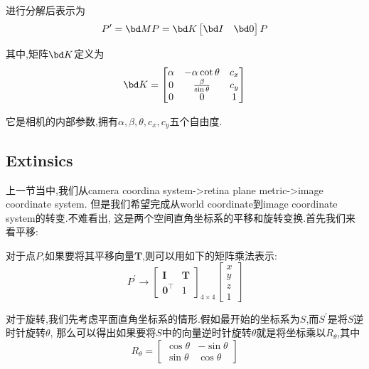 进行分解后表示为
\begin{equation}
	P^\prime = \bd M P = \bd K \begin{bmatrix}
		\bd I & \bd 0
	\end{bmatrix} P
\end{equation}

其中,矩阵$\bd K$定义为
\begin{equation}
	\bd K = \begin{bmatrix}
		\alpha & -\alpha \cot \theta & c_x
		\\
		0 & \frac{\beta}{\sin \theta} & c_y
		\\
		0 & 0 & 1
	\end{bmatrix}
\end{equation}

它是相机的内部参数,拥有$\alpha, \beta, \theta, c_x, c_y$五个自由度.

\subsection{Extinsics}
上一节当中,我们从camera coordina system->retina plane metric->image coordinate system.
但是我们希望完成从world coordinate到image coordinate system的转变.不难看出,
这是两个空间直角坐标系的平移和旋转变换.首先我们来看平移:

对于点$P$,如果要将其平移向量$\bm T$,则可以用如下的矩阵乘法表示:
\begin{equation}
	P^{\prime} \rightarrow\left[\begin{array}{ll}
		\mathbf{I} & \bm T \\
		\bm 0^\top & 1
	\end{array}\right]_{4 \times 4}\left[\begin{array}{c}
		x \\
		y \\
		z \\
		1
	\end{array}\right]
\end{equation}

对于旋转,我们先考虑平面直角坐标系的情形.假如最开始的坐标系为$S$,而$S^\prime$是将$S$逆时针旋转$\theta$,
那么可以得出如果要将$S$中的向量逆时针旋转$\theta$就是将坐标乘以$R_\theta$,其中
\begin{equation}
	R_{\theta} = \begin{bmatrix}
		\cos \theta & - \sin \theta
		\\
		\sin\theta & \cos \theta
	\end{bmatrix}
\end{equation}

